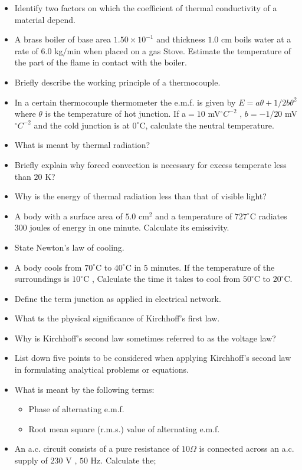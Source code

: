 \documentclass{article}
\begin{document}
\begin{itemize}
\item Identify two factors on which the coefficient of thermal conductivity of a material depend.
\item A brass boiler of base area $ 1.50\times 10^{-1}$ and thickness $ 1.0$ cm boils water at a rate of $ 6.0$ kg$/$min when placed on a gas Stove. Estimate the temperature of the part of the flame in contact with the boiler.
\item Briefly describe the working principle of a thermocouple. 
\item In a certain thermocouple thermometer the e.m.f. is given by $ E= a \theta + 1/2 b\theta^{2}$ where $ \theta $ is the temperature of hot junction. If a$ =10 $ mV$ ^{\circ}C^{-2}$ , $ b=-1/20 $ mV$ ^{\circ}C^{-2}$ and the cold junction is at $ 0^{\circ}$C, calculate the neutral temperature. 
\item What is meant by thermal radiation?
\item Briefly explain why forced convection is necessary for excess temperate less than $ 20$ K? 
\item Why is the energy of thermal radiation less than that of visible light? 
\item A body with a surface area of $ 5.0 $ cm$ ^{2}$ and a temperature of $ 727^{\circ}$C radiates $ 300$ joules of energy in one minute. Calculate its emissivity.
\item State Newton’s law of cooling. 
\item A body cools from $ 70^{\circ}$C to $ 40^{\circ}$C in $ 5$ minutes. If the temperature of the surroundings is $ 10^{\circ}$C , Calculate the time it takes to cool from $ 50^{\circ}$C to $ 20^{\circ}$C.  
\item Define the term junction as applied in electrical network.
\item What ts the physical significance of Kirchhoff’s first law.
\item Why is Kirchhoff’s second law sometimes referred to as the voltage law?
\item List down five points to be considered when applying Kirchhoff’s second law in formulating analytical problems or equations.
\item What is meant by the following terms:
 \begin{itemize}
\item  Phase of alternating e.m.f.
\item  Root mean square (r.m.s.) value of alternating e.m.f.
\end{itemize}
\item An a.c. circuit consists of a pure resistance of $ 10\Omega $ is connected across an a.c. supply of $ 230$ V , $ 50$ Hz.  Calculate the;

\end{itemize}
\end{document}
